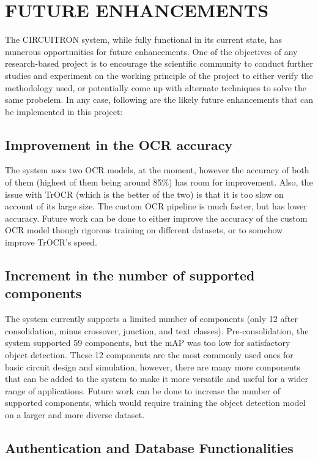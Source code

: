 \chapter{FUTURE ENHANCEMENTS}

The CIRCUITRON system, while fully functional in its current state, has numerous opportunities for future enhancements. One of the objectives of any research-based project is to encourage the scientific community to conduct further studies and experiment on the working principle of the project to either verify the methodology used, or potentially come up with alternate techniques to solve the same probelem. In any case, following are the likely future enhancements that can be implemented in this project:

\section{Improvement in the OCR accuracy}

The system uses two OCR models, at the moment, however the accuracy of both of them (highest of them being around 85\%) has room for improvement. Also, the issue with TrOCR (which is the better of the two) is that it is too slow on account of its large size. The custom OCR pipeline is much faster, but has lower accuracy. Future work can be done to either improve the accuracy of the custom OCR model though rigorous training on different datasets, or to somehow improve TrOCR's speed.

\section{Increment in the number of supported components}

The system currently supports a limited number of components (only 12 after consolidation, minus crossover, junction, and text classes). Pre-consolidation, the system supported 59 components, but the mAP was too low for satisfactory object detection. These 12 components are the most commonly used ones for basic circuit design and simulation, however, there are many more components that can be added to the system to make it more versatile and useful for a wider range of applications. Future work can be done to increase the number of supported components, which would require training the object detection model on a larger and more diverse dataset.

\section{Authentication and Database Functionalities}

